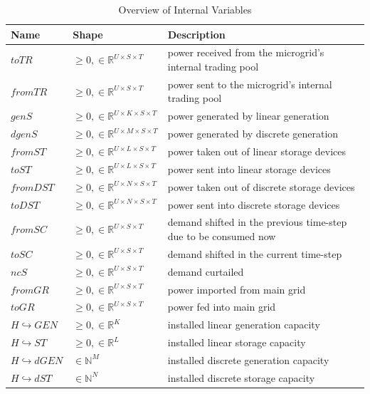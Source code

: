 \documentclass[
	11pt,								%
	DIV10,								%
	a4paper,         					%
	oneside,							%
	headheight=20pt,					%
	footheight=20pt,					%
    parskip=full,						%
    listof=totoc,						%
	bibliography=totoc,					%
	index=totoc,						%
]{scrartcl}
\begin{document}
\begin{table}[H]
	\centering
	\caption{Overview of Internal Variables}
	\begin{tabular}{llp{8cm}}
		\hline
		\textbf{Name}			& \textbf{Shape}  & \textbf{Description}	\\ 
		\hline
		$toTR$ & $\geq 0, \in \mathbb{R}^{U\times S\times T}$ & power received from the microgrid's internal trading pool \\
		$fromTR$ & $\geq 0, \in \mathbb{R}^{U\times S\times T}$ & power sent to the microgrid's internal trading pool \\
		$genS$ & $\geq 0, \in \mathbb{R}^{U\times K \times S\times T}$ & power generated by linear generation \\
		$dgenS$ & $\geq 0, \in \mathbb{R}^{U\times M \times S\times T}$ & power generated by discrete generation \\
		$fromST$ & $\geq 0, \in \mathbb{R}^{U\times L \times S\times T}$ & power taken out of linear storage devices \\
		$toST$ & $\geq 0, \in \mathbb{R}^{U\times L \times S\times T}$ & power sent into linear storage devices \\
		$fromDST$ & $\geq 0, \in \mathbb{R}^{U\times N \times S\times T}$ & power taken out of discrete storage devices \\
		$toDST$ & $\geq 0, \in \mathbb{R}^{U\times N \times S\times T}$ & power sent into discrete storage devices \\
		$fromSC$ & $\geq 0, \in \mathbb{R}^{U \times S\times T}$ & demand shifted in the previous time-step due to be consumed now \\
		$toSC$ & $\geq 0, \in \mathbb{R}^{U \times S\times T}$ & demand shifted in the current time-step \\
		$ncS$ & $\geq 0, \in \mathbb{R}^{U \times S\times T}$ & demand curtailed \\
		$fromGR$ & $\geq 0, \in \mathbb{R}^{U \times S\times T}$ & power imported from main grid \\
		$toGR$ & $\geq 0, \in \mathbb{R}^{U \times S\times T}$ & power fed into main grid \\
		$H \hookrightarrow GEN$ & $\geq 0, \in \mathbb{R}^{K}$ & installed linear generation capacity \\
		$H \hookrightarrow ST$ & $\geq 0, \in \mathbb{R}^{L}$ & installed linear storage capacity \\
		$H \hookrightarrow dGEN$ & $\in \mathbb{N}^{M}$ & installed discrete generation capacity \\
		$H \hookrightarrow dST$ & $\in \mathbb{N}^{N}$ & installed discrete storage capacity \\

		
		
		\hline
	\end{tabular}
\end{table}
\end{document}
